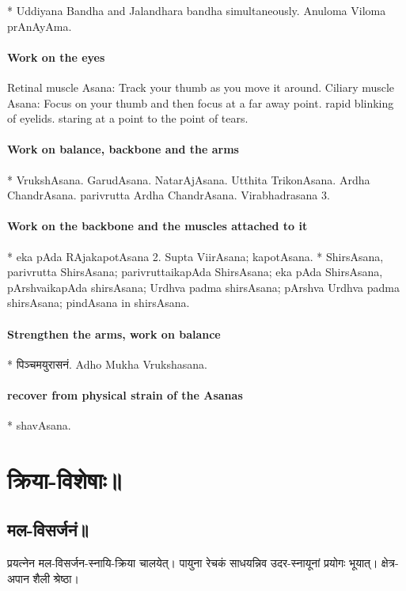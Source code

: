 \documentclass[oneside, article]{memoir}
\begin{document}
    * Uddiyana Bandha and Jalandhara bandha simultaneously. Anuloma Viloma prAnAyAma.

\subsection{Work on the eyes}

Retinal muscle Asana: Track your thumb as you move it around. Ciliary muscle Asana: Focus on your thumb and then focus at a far away point. rapid blinking of eyelids. staring at a point to the point of tears.

\subsection{Work on balance, backbone and the arms}

    * VrukshAsana. GarudAsana. NatarAjAsana. Utthita TrikonAsana. Ardha ChandrAsana. parivrutta Ardha ChandrAsana. Virabhadrasana 3.

\subsection{Work on the backbone and the muscles attached to it}

    * eka pAda RAjakapotAsana 2. Supta ViirAsana; kapotAsana. 
    * ShirsAsana, parivrutta ShirsAsana; parivruttaikapAda ShirsAsana; eka pAda ShirsAsana, pArshvaikapAda shirsAsana; Urdhva padma shirsAsana; pArshva Urdhva padma shirsAsana; pindAsana in shirsAsana.

\subsection{Strengthen the arms, work on balance}

    * पिञ्चमयुरासनं. Adho Mukha Vrukshasana.

\subsection{recover from physical strain of the Asanas}

    * shavAsana.


\part{क्रिया-विशेषाः॥}
\chapter{मल-विसर्जनं॥}
प्रयत्नेन मल-विसर्जन-स्नायि-क्रिया चालयेत्। पायुना रेचकं साधयन्निव उदर-स्नायूनां‌ प्रयोगः भूयात्। क्षेत्र-अपान शैली श्रेष्ठा।
\end{document}
